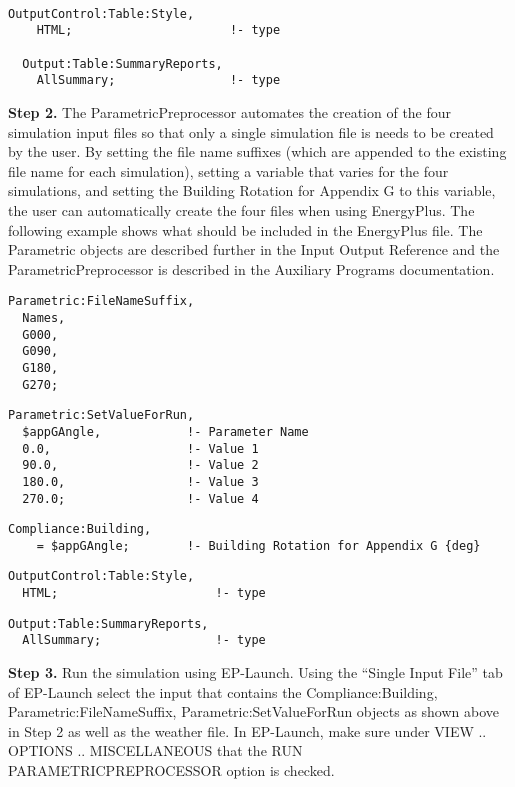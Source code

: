 \begin{lstlisting}

OutputControl:Table:Style,
    HTML;                      !- type

  Output:Table:SummaryReports,
    AllSummary;                !- type
\end{lstlisting}

\textbf{Step 2.} The ParametricPreprocessor automates the creation of the four simulation input files so that only a single simulation file is needs to be created by the user. By setting the file name suffixes (which are appended to the existing file name for each simulation), setting a variable that varies for the four simulations, and setting the Building Rotation for Appendix G to this variable, the user can automatically create the four files when using EnergyPlus. The following example shows what should be included in the EnergyPlus file. The Parametric objects are described further in the Input Output Reference and the ParametricPreprocessor is described in the Auxiliary Programs documentation.

\begin{lstlisting}
Parametric:FileNameSuffix,
  Names,
  G000,
  G090,
  G180,
  G270;
\end{lstlisting}

\begin{lstlisting}
Parametric:SetValueForRun,
  $appGAngle,            !- Parameter Name
  0.0,                   !- Value 1
  90.0,                  !- Value 2
  180.0,                 !- Value 3
  270.0;                 !- Value 4
\end{lstlisting}

\begin{lstlisting}
Compliance:Building,
    = $appGAngle;        !- Building Rotation for Appendix G {deg}
\end{lstlisting}

\begin{lstlisting}
OutputControl:Table:Style,
  HTML;                      !- type
\end{lstlisting}

\begin{lstlisting}
Output:Table:SummaryReports,
  AllSummary;                !- type
\end{lstlisting}

\textbf{Step 3.} Run the simulation using EP-Launch. Using the ``Single Input File'' tab of EP-Launch select the input that contains the Compliance:Building, Parametric:FileNameSuffix, Parametric:SetValueForRun objects as shown above in Step 2 as well as the weather file. In EP-Launch, make sure under VIEW .. OPTIONS .. MISCELLANEOUS that the RUN PARAMETRICPREPROCESSOR option is checked.

